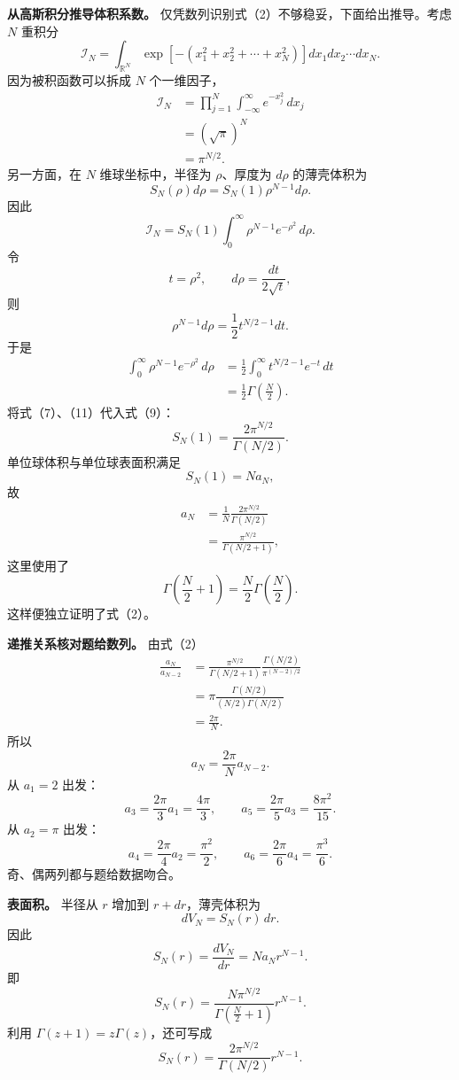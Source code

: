 \documentclass[12pt,a4paper,UTF8]{ctexart}
\begin{document}
\textbf{从高斯积分推导体积系数。}
仅凭数列识别式（2）不够稳妥，下面给出推导。考虑 \(N\) 重积分 \[
\mathcal I_N
=\int_{\mathbb R^N}
\exp\left[-(x_1^2+x_2^2+\cdots+x_N^2)\right]
dx_1dx_2\cdots dx_N. \tag{6}
\] 因为被积函数可以拆成 \(N\) 个一维因子， \[
\begin{aligned}
\mathcal I_N
&=\prod_{j=1}^N
\int_{-\infty}^{\infty}e^{-x_j^2}\,dx_j\\
&=(\sqrt\pi)^N\\
&=\pi^{N/2}.
\end{aligned} \tag{7}
\] 另一方面，在 \(N\) 维球坐标中，半径为 \(\rho\)、厚度为 \(d\rho\)
的薄壳体积为 \[
S_N(\rho)d\rho
=S_N(1)\rho^{N-1}d\rho. \tag{8}
\] 因此 \[
\mathcal I_N
=S_N(1)
\int_0^\infty
\rho^{N-1}e^{-\rho^2}\,d\rho. \tag{9}
\] 令 \[
t=\rho^2,
\qquad
d\rho=\frac{dt}{2\sqrt t},
\] 则 \[
\rho^{N-1}d\rho
=\frac12t^{N/2-1}dt. \tag{10}
\] 于是 \[
\begin{aligned}
\int_0^\infty
\rho^{N-1}e^{-\rho^2}\,d\rho
&=\frac12
\int_0^\infty t^{N/2-1}e^{-t}\,dt\\
&=\frac12\Gamma\left(\frac N2\right).
\end{aligned} \tag{11}
\] 将式（7）、（11）代入式（9）： \[
\boxed{
S_N(1)
=\frac{2\pi^{N/2}}{\Gamma(N/2)}
}. \tag{12}
\] 单位球体积与单位球表面积满足 \[
S_N(1)=Na_N, \tag{13}
\] 故 \[
\begin{aligned}
a_N
&=\frac1N
\frac{2\pi^{N/2}}{\Gamma(N/2)}\\
&=\frac{\pi^{N/2}}
{\Gamma(N/2+1)},
\end{aligned} \tag{14}
\] 这里使用了 \[
\Gamma\left(\frac N2+1\right)
=\frac N2\Gamma\left(\frac N2\right).
\] 这样便独立证明了式（2）。

\textbf{递推关系核对题给数列。} 由式（2） \[
\begin{aligned}
\frac{a_N}{a_{N-2}}
&=\frac{\pi^{N/2}}
{\Gamma(N/2+1)}
\frac{\Gamma(N/2)}{\pi^{(N-2)/2}}\\
&=\pi
\frac{\Gamma(N/2)}
{(N/2)\Gamma(N/2)}\\
&=\frac{2\pi}{N}.
\end{aligned} \tag{15}
\] 所以 \[
\boxed{
a_N=\frac{2\pi}{N}a_{N-2}
}. \tag{16}
\] 从 \(a_1=2\) 出发： \[
a_3=\frac{2\pi}{3}a_1=\frac{4\pi}{3},
\qquad
a_5=\frac{2\pi}{5}a_3=\frac{8\pi^2}{15}.
\] 从 \(a_2=\pi\) 出发： \[
a_4=\frac{2\pi}{4}a_2=\frac{\pi^2}{2},
\qquad
a_6=\frac{2\pi}{6}a_4=\frac{\pi^3}{6}.
\] 奇、偶两列都与题给数据吻合。

\textbf{表面积。} 半径从 \(r\) 增加到 \(r+dr\)，薄壳体积为 \[
dV_N=S_N(r)\,dr.
\] 因此 \[
S_N(r)=\frac{dV_N}{dr}
=Na_Nr^{N-1}. \tag{17}
\] 即 \[
\boxed{
S_N(r)
=\frac{N\pi^{N/2}}{\Gamma\!\left(\frac N2+1\right)}
r^{N-1}
}. \tag{18}
\] 利用 \(\Gamma(z+1)=z\Gamma(z)\)，还可写成 \[
S_N(r)=\frac{2\pi^{N/2}}{\Gamma(N/2)}r^{N-1}. \tag{19}
\]
\end{document}
